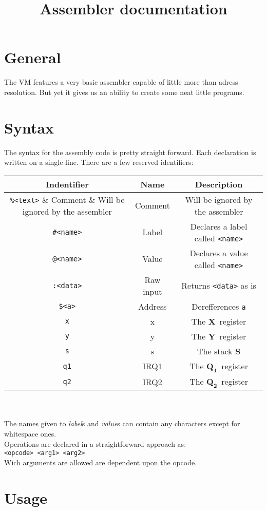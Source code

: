 \documentclass{article}
\newcommand{\V}{\verb}
\newcommand{\x}{$\textbf{X}$}
\newcommand{\y}{$\textbf{Y}$}
\newcommand{\s}{$\textbf{S}$}
\newcommand{\q}{$\textbf{Q}_{\textbf{1}}$}
\newcommand{\qq}{$\textbf{Q}_{\textbf{2}}$}
\begin{document}
\title{Assembler documentation}

\section{General}
The VM features a very basic assembler capable of little more than adress
resolution. But yet it gives us an ability to create some neat little programs.
\section{Syntax}
The syntax for the assembly code is pretty straight forward. Each declaration is
written on a single line. There are a few reserved identifiers:

\begin{tabular}{|c | c| c |}
\hline
Indentifier & Name & Description\\
\hline
\V+%
\hline
\V+#<name>+ & Label & Declares a label called \V+<name>+ \\
\hline
\V+@<name>+ & Value & Declares a value called \V+<name>+\\
\hline
\V+:<data>+ & Raw input & Returns \V+<data>+ as is \\
\hline
\verb+$<a>+ & Address & Derefferences \V+a+\\
\hline
\V+x+ & x & The \x \ register \\
\hline
\V+y+ & y & The \y \ register \\
\hline
\V+s+ & s & The stack \s \\
\hline
\V+q1+ & IRQ1 & The \q \ register\\
\hline
\V+q2+ & IRQ2 & The \qq \ register\\
\hline
\end{tabular}
\\
\\
The names given to \emph{label}s and \emph{value}s can contain any characters except for
whitespace ones.\\
Operations are declared in a straightforward approach as:\\
\V+<opcode> <arg1> <arg2>+ \\
Wich arguments are allowed are dependent upon the opcode.\\


\section{Usage}
\end{document}
